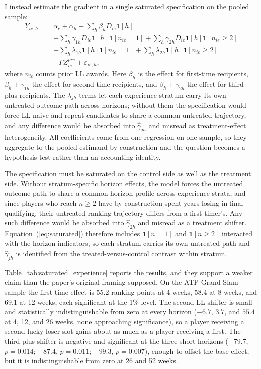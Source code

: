 I instead estimate the gradient in a single saturated specification on the pooled sample:
\begin{equation}
\label{eq:saturated}
\begin{split}
Y_{ie,h} = {} & \alpha_e + \alpha_h + \sum_h \beta_h D_{ie}\mathbf{1}[h] \\
 & + \sum_h \gamma_{1h} D_{ie}\mathbf{1}[h]\mathbf{1}[n_{ie}=1]
   + \sum_h \gamma_{2h} D_{ie}\mathbf{1}[h]\mathbf{1}[n_{ie}\geq 2] \\
 & + \sum_h \lambda_{1h} \mathbf{1}[h]\mathbf{1}[n_{ie}=1]
   + \sum_h \lambda_{2h} \mathbf{1}[h]\mathbf{1}[n_{ie}\geq 2] \\
 & + \Gamma Z^{pre}_{ie} + \varepsilon_{ie,h},
\end{split}
\end{equation}
where $n_{ie}$ counts prior LL awards. Here $\beta_h$ is the effect for first-time recipients, $\beta_h + \gamma_{1h}$ the effect for second-time recipients, and $\beta_h + \gamma_{2h}$ the effect for third-plus recipients. The $\lambda_{jh}$ terms let each experience stratum carry its own untreated outcome path across horizons; without them the specification would force LL-naive and repeat candidates to share a common untreated trajectory, and any difference would be absorbed into $\hat\gamma_{jh}$ and misread as treatment-effect heterogeneity. All coefficients come from one regression on one sample, so they aggregate to the pooled estimand by construction and the question becomes a hypothesis test rather than an accounting identity.

The specification must be saturated on the control side as well as the treatment side. Without stratum-specific horizon effects, the model forces the untreated outcome path to share a common horizon profile across experience strata, and since players who reach $n \geq 2$ have by construction spent years losing in final qualifying, their untreated ranking trajectory differs from a first-timer's. Any such difference would be absorbed into $\hat\gamma_{2h}$ and misread as a treatment shifter. Equation~(\ref{eq:saturated}) therefore includes $\mathbf{1}[n=1]$ and $\mathbf{1}[n \geq 2]$ interacted with the horizon indicators, so each stratum carries its own untreated path and $\hat\gamma_{jh}$ is identified from the treated-versus-control contrast within stratum.

Table~\ref{tab:saturated_experience} reports the results, and they support a weaker claim than the paper's original framing supposed. On the ATP Grand Slam sample the first-time effect is 55.2 ranking points at 4 weeks, 58.4 at 8 weeks, and 69.1 at 12 weeks, each significant at the 1\% level. The second-LL shifter is small and statistically indistinguishable from zero at every horizon ($-6.7$, $3.7$, and $55.4$ at 4, 12, and 26 weeks, none approaching significance), so a player receiving a second lucky loser slot gains about as much as a player receiving a first. The third-plus shifter is negative and significant at the three short horizons ($-79.7$, $p = 0.014$; $-87.4$, $p = 0.011$; $-99.3$, $p = 0.007$), enough to offset the base effect, but it is indistinguishable from zero at 26 and 52 weeks.

